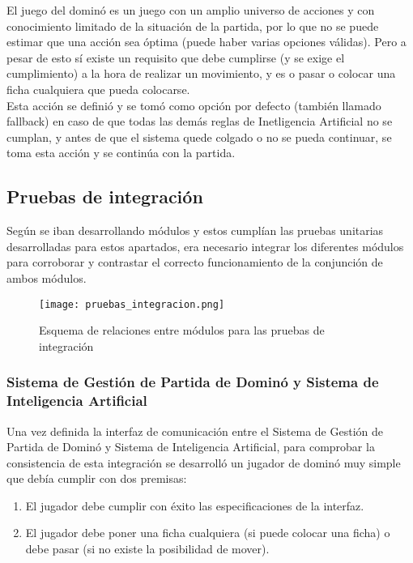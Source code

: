 El juego del dominó es un juego con un amplio universo de acciones y con conocimiento limitado de la situación de la partida,
por lo que no se puede estimar que una acción sea óptima (puede haber varias opciones válidas). Pero a pesar de esto sí existe
un requisito que debe cumplirse (y se exige el cumplimiento) a la hora de realizar un movimiento, y es o pasar o colocar una
ficha cualquiera que pueda colocarse. \\

Esta acción se definió y se tomó como opción por defecto (también llamado fallback) en caso de que todas las demás reglas
de Inetligencia Artificial no se cumplan, y antes de que el sistema quede colgado o no se pueda continuar, se toma esta acción y se continúa
con la partida.


\subsection{Pruebas de integración}

Según se iban desarrollando módulos y estos cumplían las pruebas unitarias desarrolladas para estos apartados, era necesario
integrar los diferentes módulos para corroborar y contrastar el correcto funcionamiento de la conjunción de ambos módulos.

\begin{figure}[h]
  \begin{center}
    \texttt{[image: pruebas\_integracion.png]}
  \end{center}
  \caption{Esquema de relaciones entre módulos para las pruebas de integración}
  \label{pruebas_integracion}
\end{figure}

\subsubsection{Sistema de Gestión de Partida de Dominó y Sistema de Inteligencia Artificial}

Una vez definida la interfaz de comunicación entre el Sistema de Gestión de Partida de Dominó y Sistema de Inteligencia
Artificial, para comprobar la consistencia de esta integración se desarrolló un jugador de dominó muy simple que debía
cumplir con dos premisas:

\begin{enumerate}
    \item El jugador debe cumplir con éxito las especificaciones de la interfaz.
    \item El jugador debe poner una ficha cualquiera (si puede colocar una ficha) o debe pasar (si no existe la posibilidad
            de mover).
\end{enumerate}

